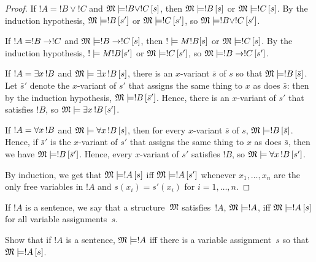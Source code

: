 \documentclass[open-logic-section]{subfiles}
\begin{document}
\begin{proof}
If $!A = !B \lor !C$ and $\Sat{M}{!B \lor !C}[s]$, then $\Sat{M}{!B}[s]$ or $\Sat{M}{!C}[s]$. By the induction hypothesis, $\Sat{M}{!B}[s']$ or $\Sat{M}{!C}[s']$, so $\Sat{M}{!B \lor !C}[s']$.

If $!A = !B \to !C$ and $\Sat{M}{!B \lif !C}[s]$, then $\Sat!{M}{!B}[s]$ or $\Sat{M}{!C}[s]$. By the induction hypothesis, $\Sat!{M}{!B}[s']$ or $\Sat{M}{!C}[s']$, so $\Sat{M}{!B \lif !C}[s']$.

If $!A = \lexists[x][!B]$ and $\Sat{M}{\lexists[x][!B]}[s]$, there is an $x$-variant $\bar{s}$ of $s$ so that $\Sat{M}{!B}[\bar{s}]$. Let $\bar{s}'$ denote the $x$-variant of $s'$ that assigns the same thing to $x$ as does $\bar{s}$: then by the induction hypothesis, $\Sat{M}{!B}[\bar{s}']$. Hence, there is an $x$-variant of $s'$ that satisfies $!B$, so $\Sat{M}{\lexists[x][!B]}[s']$.

If $!A = \lforall[x][!B]$ and $\Sat{M}{\lforall[x][!B]}[s]$, then for every $x$-variant $\bar{s}$ of $s$, $\Sat{M}{!B}[\bar{s}]$. Hence, if $\bar{s}'$ is the $x$-variant of $s'$ that assigns the same thing to $x$ as does $\bar{s}$, then we have $\Sat{M}{!B}[\bar{s}']$. Hence, every $x$-variant of $s'$ satisfies $!B$, so $\Sat{M}{\lforall[x][!B]}[s']$.

By induction, we get that $\Sat{M}{!A}[s]$ iff $\Sat{M}{!A}[s']$ whenever $x_1,\ldots,x_n$ are the only free variables in $!A$ and $s(x_i)=s'(x_i)$ for $i=1,\ldots,n$. 

\end{proof}
 
\begin{defn}
If $!A$ is a sentence, we say that a structure~$\mathfrak M$
satisfies~$!A$, $\Sat{M}{!A}$, iff $\Sat{M}{!A}[s]$ for all variable
assignments~$s$.
\end{defn}

\begin{prob}
Show that if $!A$ is a sentence, $\Sat{M}{!A}$ iff there is a variable
assignment~$s$ so that $\Sat{M}{!A}[s]$.
\end{prob}
\end{document}
